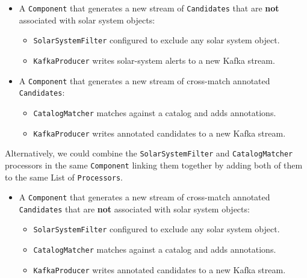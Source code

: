\documentclass{article}
\begin{document}
\begin{itemize}
    \item A \texttt{Component} that generates a new stream of \texttt{Candidates} that are \textbf{not} associated with solar system objects:
    \begin{itemize}
        \item \texttt{SolarSystemFilter} configured to exclude any solar system object.
    \end{itemize}
    \begin{itemize}
        \item \texttt{KafkaProducer} writes solar-system alerts to a new Kafka stream.
    \end{itemize}
\end{itemize}

\begin{itemize}
    \item A \texttt{Component} that generates a new stream of cross-match annotated \texttt{Candidates}:
    \begin{itemize}
        \item \texttt{CatalogMatcher} matches against a catalog and adds annotations.
    \end{itemize}
    \begin{itemize}
        \item \texttt{KafkaProducer} writes annotated candidates to a new Kafka stream.
    \end{itemize}
\end{itemize}

Alternatively, we could combine the \texttt{SolarSystemFilter} and \texttt{CatalogMatcher} processors in the same \texttt{Component} linking them together by adding both of them to the same List of \texttt{Processors}.

\begin{itemize}
    \item A \texttt{Component} that generates a new stream of cross-match annotated \texttt{Candidates} that are \textbf{not} associated with solar system objects:
    \begin{itemize}
        \item \texttt{SolarSystemFilter} configured to exclude any solar system object.
    \end{itemize}
    \begin{itemize}
        \item \texttt{CatalogMatcher} matches against a catalog and adds annotations.
    \end{itemize}
    \begin{itemize}
        \item \texttt{KafkaProducer} writes annotated candidates to a new Kafka stream.
    \end{itemize}
\end{itemize}
\end{document}
